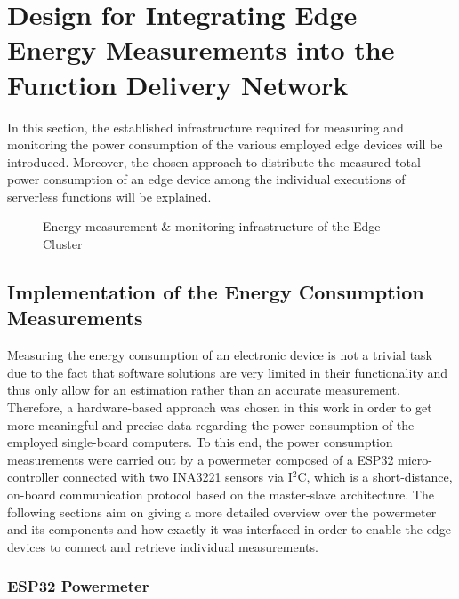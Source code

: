 \chapter{Design for Integrating Edge Energy Measurements into the Function Delivery Network}\label{chapter:methodology}
In this section, the established infrastructure required for measuring and monitoring the power consumption of the various employed edge devices will be introduced. Moreover, the chosen approach to distribute the measured total power consumption of an edge device among the individual executions of serverless functions will be explained.

\begin{figure}[h]
    \centering
    
    \caption{Energy measurement \& monitoring infrastructure of the Edge Cluster}
    \label{fig:fdn-edge-energy-enhancement}
\end{figure}

\section{Implementation of the Energy Consumption Measurements}
Measuring the energy consumption of an electronic device is not a trivial task due to the fact that software solutions are very limited in their functionality and thus only allow for an estimation rather than an accurate measurement. Therefore, a hardware-based approach was chosen in this work in order to get more meaningful and precise data regarding the power consumption of the employed single-board computers. To this end, the power consumption measurements were carried out by a powermeter composed of a ESP32 micro-controller connected with two INA3221 sensors via I$^{2}$C, which is a short-distance, on-board communication protocol based on the master-slave architecture. The following sections aim on giving a more detailed overview over the powermeter and its components and how exactly it was interfaced in order to enable the edge devices to connect and retrieve individual measurements.

\subsection{ESP32 Powermeter}

